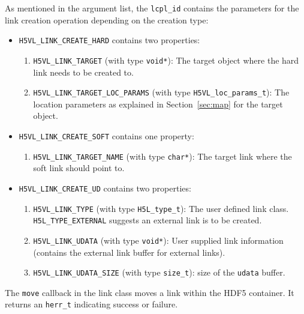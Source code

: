 As mentioned in the argument list, the \texttt{lcpl\_id} contains the
parameters for the link creation operation depending on the creation
type:
\begin{itemize}
\item \texttt{H5VL\_LINK\_CREATE\_HARD} contains two properties:
  \begin{enumerate}
  \item \texttt{H5VL\_LINK\_TARGET} (with type \texttt{void*}): The target
    object where the hard link needs to be created to.
  \item \texttt{H5VL\_LINK\_TARGET\_LOC\_PARAMS} (with type \texttt{H5VL\_loc\_params\_t}): The location parameters as explained in
    Section~\ref{sec:map} for the target object.
  \end{enumerate}

\item \texttt{H5VL\_LINK\_CREATE\_SOFT} contains one property:
  \begin{enumerate}
  \item \texttt{H5VL\_LINK\_TARGET\_NAME} (with type \texttt{char*}): The target
    link where the soft link should point to.
  \end{enumerate}

\item \texttt{H5VL\_LINK\_CREATE\_UD} contains two properties:
  \begin{enumerate}
  \item \texttt{H5VL\_LINK\_TYPE} (with type \texttt{H5L\_type\_t}): The
    user defined link class. \texttt{H5L\_TYPE\_EXTERNAL} suggests an
    external link is to be created.
  \item \texttt{H5VL\_LINK\_UDATA} (with type \texttt{void*}): User supplied
    link information (contains the external link buffer for external
    links). 
  \item \texttt{H5VL\_LINK\_UDATA\_SIZE} (with type \texttt{size\_t}): size
    of the \texttt{udata} buffer. 
  \end{enumerate}
\end{itemize}

The \texttt{move} callback in the link class moves a link within the HDF5 container. It returns an \texttt{herr\_t} indicating success or failure.\bigskip


